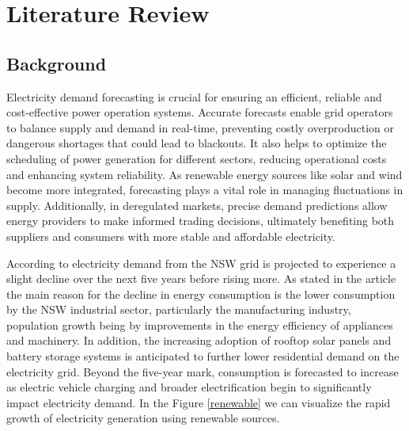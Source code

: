\documentclass[mstat,12pt]{unswthesis}
\begin{document}
\chapter{Literature Review}\label{literature-review}

\section{Background}\label{background}

Electricity demand forecasting is crucial for ensuring an efficient,
reliable and cost-effective power operation systems. Accurate forecasts
enable grid operators to balance supply and demand in real-time,
preventing costly overproduction or dangerous shortages that could lead
to blackouts. It also helps to optimize the scheduling of power
generation for different sectors, reducing operational costs and
enhancing system reliability. As renewable energy sources like solar and
wind become more integrated, forecasting plays a vital role in managing
fluctuations in supply. Additionally, in deregulated markets, precise
demand predictions allow energy providers to make informed trading
decisions, ultimately benefiting both suppliers and consumers with more
stable and affordable electricity.

According to \cite{nsw_epa_2021_energy_consumption} electricity demand
from the NSW grid is projected to experience a slight decline over the
next five years before rising more. As stated in the article the main
reason for the decline in energy consumption is the lower consumption by
the NSW industrial sector, particularly the manufacturing industry,
population growth being by improvements in the energy efficiency of
appliances and machinery. In addition, the increasing adoption of
rooftop solar panels and battery storage systems is anticipated to
further lower residential demand on the electricity grid. Beyond the
five-year mark, consumption is forecasted to increase as electric
vehicle charging and broader electrification begin to significantly
impact electricity demand. In the Figure \ref{renewable} we can
visualize the rapid growth of electricity generation using renewable
sources.
\end{document}
